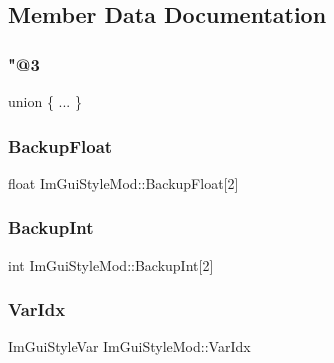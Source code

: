 \subsection{Member Data Documentation}
\hypertarget{struct_im_gui_style_mod_aecd20df739984d80e5a90a7c12927fd1}{}\label{struct_im_gui_style_mod_aecd20df739984d80e5a90a7c12927fd1} 
\subsubsection{\texorpdfstring{"@3}{@3}}
{\footnotesize\ttfamily union \{ ... \} }

\hypertarget{struct_im_gui_style_mod_af36b5cf1100de970d78a53db937be949}{}\label{struct_im_gui_style_mod_af36b5cf1100de970d78a53db937be949} 
\subsubsection{\texorpdfstring{Backup\+Float}{BackupFloat}}
{\footnotesize\ttfamily float Im\+Gui\+Style\+Mod\+::\+Backup\+Float\mbox{[}2\mbox{]}}

\hypertarget{struct_im_gui_style_mod_a60491c95989b2a866ebb76403a562f6f}{}\label{struct_im_gui_style_mod_a60491c95989b2a866ebb76403a562f6f} 
\subsubsection{\texorpdfstring{Backup\+Int}{BackupInt}}
{\footnotesize\ttfamily int Im\+Gui\+Style\+Mod\+::\+Backup\+Int\mbox{[}2\mbox{]}}

\hypertarget{struct_im_gui_style_mod_ab23c55941dbd0e156ce640a8fecb2feb}{}\label{struct_im_gui_style_mod_ab23c55941dbd0e156ce640a8fecb2feb} 
\subsubsection{\texorpdfstring{Var\+Idx}{VarIdx}}
{\footnotesize\ttfamily Im\+Gui\+Style\+Var Im\+Gui\+Style\+Mod\+::\+Var\+Idx}

